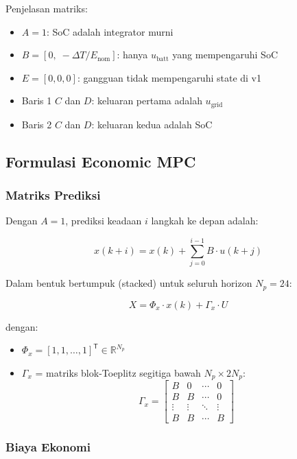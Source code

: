 \documentclass{article}
\begin{document}
Penjelasan matriks:
\begin{itemize}
    \item $A = 1$: SoC adalah integrator murni
    \item $B = [0,\; -\Delta T/E_{\text{nom}}]$: hanya $u_{\text{batt}}$ yang mempengaruhi SoC
    \item $E = [0,0,0]$: gangguan tidak mempengaruhi state di v1
    \item Baris 1 $C$ dan $D$: keluaran pertama adalah $u_{\text{grid}}$
    \item Baris 2 $C$ dan $D$: keluaran kedua adalah SoC
\end{itemize}

\subsection{Formulasi Economic MPC}

\subsubsection{Matriks Prediksi}

Dengan $A = 1$, prediksi keadaan $i$ langkah ke depan adalah:

$$x(k+i) = x(k) + \sum_{j=0}^{i-1} B \cdot u(k+j)$$

Dalam bentuk bertumpuk (stacked) untuk seluruh horizon $N_p = 24$:

\begin{equation}
X = \Phi_x \cdot x(k) + \Gamma_x \cdot U
\end{equation}

dengan:
\begin{itemize}
    \item $\Phi_x = [1, 1, \ldots, 1]^{\mathsf T} \in \mathbb{R}^{N_p}$ 
    \item $\Gamma_x$ = matriks blok-Toeplitz segitiga bawah $N_p \times 2N_p$:
    $$\Gamma_x = \begin{bmatrix} B & 0 & \cdots & 0 \\ B & B & \cdots & 0 \\ \vdots & \vdots & \ddots & \vdots \\ B & B & \cdots & B \end{bmatrix}$$
\end{itemize}

\subsubsection{Biaya Ekonomi}
\end{document}
